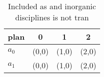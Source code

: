 \documentclass[a4paper]{article}
\begin{document}
\begin{table}
\begin{adjustbox}{width=0.6\columnwidth}
\begin{tabular}{|l|l|l|l|}
\hline
\textbf{plan} & \multicolumn{1}{c|}{\textbf{0}} & \multicolumn{1}{c|}{\textbf{1}} & \multicolumn{1}{c|}{\textbf{2}} \\ \hline
\textbf{$a_0$}  & (0,0) & (1,0) & (2,0) \\ \hline
\textbf{$a_1$}  & (0,0) & (1,0) & (2,0) \\ \hline
\end{tabular}
\end{adjustbox}
\caption{Included as and inorganic disciplines is not tran
}
\end{table}
\end{document}
